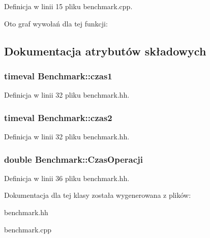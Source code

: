 \-Definicja w linii 15 pliku benchmark.\-cpp.



\-Oto graf wywołań dla tej funkcji\-:




\subsection{\-Dokumentacja atrybutów składowych}
\hypertarget{class_benchmark_a461847eb9a01e511e19af6cd7bcc057e}{
\subsubsection[{czas1}]{\setlength{\rightskip}{0pt plus 5cm}timeval {\bf \-Benchmark\-::czas1}}}\label{class_benchmark_a461847eb9a01e511e19af6cd7bcc057e}


\-Definicja w linii 32 pliku benchmark.\-hh.

\hypertarget{class_benchmark_a56ec92a30b650825403d14907a321eea}{
\subsubsection[{czas2}]{\setlength{\rightskip}{0pt plus 5cm}timeval {\bf \-Benchmark\-::czas2}}}\label{class_benchmark_a56ec92a30b650825403d14907a321eea}


\-Definicja w linii 32 pliku benchmark.\-hh.

\hypertarget{class_benchmark_accd4af9649210ce216db513c0676c401}{
\subsubsection[{\-Czas\-Operacji}]{\setlength{\rightskip}{0pt plus 5cm}double {\bf \-Benchmark\-::\-Czas\-Operacji}}}\label{class_benchmark_accd4af9649210ce216db513c0676c401}


\-Definicja w linii 36 pliku benchmark.\-hh.



\-Dokumentacja dla tej klasy została wygenerowana z plików\-:\begin{DoxyCompactItemize}
\item 
benchmark.\-hh\item 
benchmark.\-cpp\end{DoxyCompactItemize}
